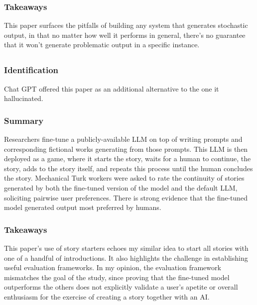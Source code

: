 \documentclass[
	letterpaper, %
]{jdf}
\begin{document}
\subsubsection{Takeaways}
This paper surfaces the pitfalls of building any system that generates stochastic output, in that no matter how well it performs in general, there's no guarantee that it won't generate problematic output in a specific instance.

\subsection{}
\subsubsection{Identification}
Chat GPT offered this paper as an additional alternative to the one it hallucinated.

\subsubsection{Summary}
Researchers fine-tune a publicly-available LLM on top of writing prompts and corresponding fictional works generating from those prompts. This LLM is then deployed as a game, where it starts the story, waits for a human to continue, the story, adds to the story itself, and repeats this process until the human concludes the story. Mechanical Turk workers were asked to rate the continuity of stories generated by both the fine-tuned version of the model and the default LLM, soliciting pairwise user preferences. There is strong evidence that the fine-tuned model generated output most preferred by humans.

\subsubsection{Takeaways}
This paper's use of story starters echoes my similar idea to start all stories with one of a handful of introductions. It also highlights the challenge in establishing useful evaluation frameworks. In my opinion, the evaluation framework mismatches the goal of the study, since proving that the fine-tuned model outperforms the others does not explicitly validate a user's apetite or overall enthusiasm for the exercise of creating a story together with an AI.
\end{document}
